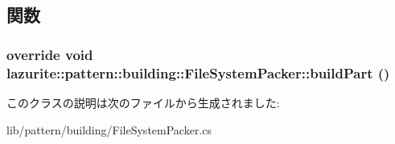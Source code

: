 \subsection{関数}
\hypertarget{classlazurite_1_1pattern_1_1building_1_1_file_system_packer_a1cc7522742142d924507f0ba288eaa07}{
\subsubsection[{buildPart}]{\setlength{\rightskip}{0pt plus 5cm}override void lazurite::pattern::building::FileSystemPacker::buildPart ()}}
\label{classlazurite_1_1pattern_1_1building_1_1_file_system_packer_a1cc7522742142d924507f0ba288eaa07}


このクラスの説明は次のファイルから生成されました:\begin{DoxyCompactItemize}
\item 
lib/pattern/building/FileSystemPacker.cs\end{DoxyCompactItemize}
